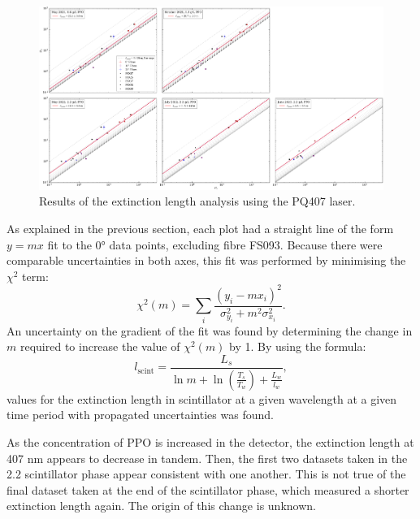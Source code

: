 \begin{figure}
    \centering
    \includegraphics[width=\textwidth]{5_SMELLIEAnalysis/images/rsrw_plot_combined_PQ405.pdf}
    \caption[Results of the extinction length analysis using the PQ407 laser]
    {Results of the extinction length analysis using the PQ407 laser.}
    \label{fig:smellie_ext_length_results_PQ407}
\end{figure}

As explained in the previous section, each plot had a straight line of the form $y = mx$ fit to the \ang{0} data points, excluding fibre FS093. Because there were comparable uncertainties in both axes, this fit was performed by minimising the $\chi^{2}$ term:
\begin{equation}
    \chi^{2}(m) = \sum_{i}\frac{\left(y_{i} - mx_{i}\right)^{2}}{\sigma^{2}_{y_{i}} + m^{2}\sigma^{2}_{x_{i}}}.
\end{equation}
An uncertainty on the gradient of the fit was found by determining the change in $m$ required to increase the value of $\chi^{2}(m)$ by 1. By using the formula:
\begin{equation}
    l_{\mathrm{scint}} = 
    \frac{
        L_{s}
        }{
        \ln{m}
        + \ln\left(
            \frac{T_{s}}{T_{w}}
        \right)
        + \frac{L_{w}}{l_{w}}
    },
\end{equation}
values for the extinction length in scintillator at a given wavelength at a given time period with propagated uncertainties was found.

As the concentration of PPO is increased in the detector, the extinction length at 407 nm appears to decrease in tandem. Then, the first two datasets taken in the \SI{2.2}{\gpl} scintillator phase appear consistent with one another. This is not true of the final dataset taken at the end of the scintillator phase, which measured a shorter extinction length again. The origin of this change is unknown.

